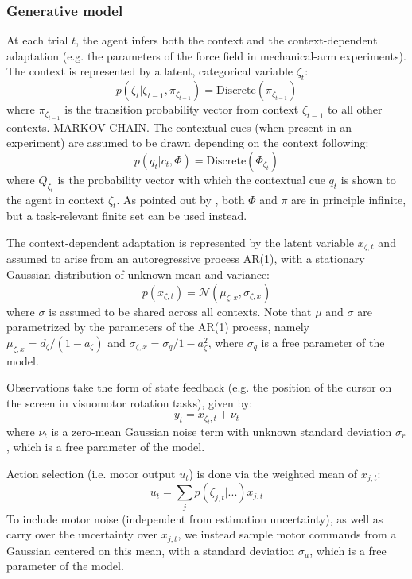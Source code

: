 \documentclass[a4paper,doc,floatsintext,natbib]{apa6}
\begin{document}
\subsubsection{Generative model}
At each trial $t$, the agent infers both the context and the context-dependent adaptation (e.g. the parameters of the force field in mechanical-arm experiments). The context is represented by a latent, categorical variable $\zeta_t$:
\begin{equation}
p(\zeta_t | \zeta_{t-1}, \pi_{\zeta_{t-1}}) = \text{Discrete}\left(\pi_{\zeta_{t-1}}\right)
\end{equation}
where $\pi_{\zeta_{t-1}}$ is the transition probability vector from context $\zeta_{t-1}$ to all other contexts. MARKOV CHAIN. The contextual cues (when present in an experiment) are assumed to be drawn depending on the context following:
\begin{equation}
p(q_t | c_t, \Phi) = \text{Discrete}(\Phi_{\zeta_t})
\end{equation}
where $Q_{\zeta_t}$ is the probability vector with which the contextual cue $q_t$ is shown to the agent in context $\zeta_t$. As pointed out by \cite{Heald_Contextual_2021}, both $\Phi$ and $\pi$ are in principle infinite, but a task-relevant finite set can be used instead.

The context-dependent adaptation is represented by the latent variable $x_{\zeta,t}$ and assumed to arise from an autoregressive process AR(1), with a stationary Gaussian distribution of unknown mean and variance:
\begin{equation}
p(x_{\zeta,t}) = \mathcal{N}(\mu_{\zeta,x}, \sigma_{\zeta,x})
\end{equation}
where $\sigma$ is assumed to be shared across all contexts. Note that $\mu$ and $\sigma$ are parametrized by the parameters of the AR(1) process, namely $\mu_{\zeta,x} = d_\zeta / (1 - a_\zeta)$ and $\sigma_{\zeta, x} = \sigma_q / 1 - a_\zeta^2$, where $\sigma_q$ is a free parameter of the model.

Observations take the form of state feedback (e.g. the position of the cursor on the screen in visuomotor rotation tasks), given by:
\begin{equation}
y_t = x_{\zeta_t, t} + \nu_t
\end{equation}
where $\nu_t$ is a zero-mean Gaussian noise term with unknown standard deviation $\sigma_r$, which is a free parameter of the model.

Action selection (i.e. motor output $u_t$) is done via the weighted mean of $x_{j,t}$:
\begin{equation}
u_t  = \displaystyle\sum_{j}p(\zeta_{j,t} | ...) x_{j,t} \label{eqn:dist-comm}
\end{equation}
To include motor noise (independent from estimation uncertainty), as well as carry over the uncertainty over $x_{j,t}$, we instead sample motor commands from a Gaussian centered on this mean, with a standard deviation $\sigma_u$, which is a free parameter of the model.
\end{document}
